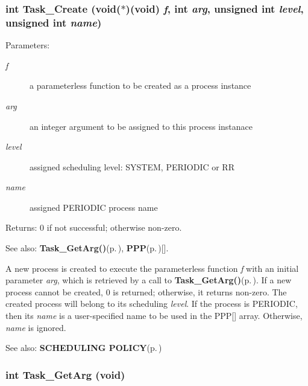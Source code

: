 \subsubsection{\setlength{\rightskip}{0pt plus 5cm}int Task\_\-Create (void($\ast$)(void) {\em f}, int {\em arg}, unsigned int {\em level}, unsigned int {\em name})}\label{os_8h_d26f7e7c3185a703e89e97547747b03e}


\begin{Desc}
\item[Parameters:]
\begin{description}
\item[{\em f}]a parameterless function to be created as a process instance \item[{\em arg}]an integer argument to be assigned to this process instanace \item[{\em level}]assigned scheduling level: SYSTEM, PERIODIC or RR \item[{\em name}]assigned PERIODIC process name \end{description}
\end{Desc}
\begin{Desc}
\item[Returns:]0 if not successful; otherwise non-zero. \end{Desc}
\begin{Desc}
\item[See also:]{\bf Task\_\-Get\-Arg()}{\rm (p.\,\pageref{os_8c_dc48a5ac983c4656508f39c0ee65283f})}, {\bf PPP}{\rm (p.\,\pageref{os_8h_9139cb65cf60e47afed151765972c100})}[].\end{Desc}
A new process is created to execute the parameterless function {\em f\/} with an initial parameter {\em arg\/}, which is retrieved by a call to {\bf Task\_\-Get\-Arg()}{\rm (p.\,\pageref{os_8c_dc48a5ac983c4656508f39c0ee65283f})}. If a new process cannot be created, 0 is returned; otherwise, it returns non-zero. The created process will belong to its scheduling {\em level\/}. If the process is PERIODIC, then its {\em name\/} is a user-specified name to be used in the PPP[] array. Otherwise, {\em name\/} is ignored. \begin{Desc}
\item[See also:]{\bf SCHEDULING POLICY}{\rm (p.\,\pageref{index_policy})} \end{Desc}
\subsubsection{\setlength{\rightskip}{0pt plus 5cm}int Task\_\-Get\-Arg (void)}\label{os_8h_dc48a5ac983c4656508f39c0ee65283f}


